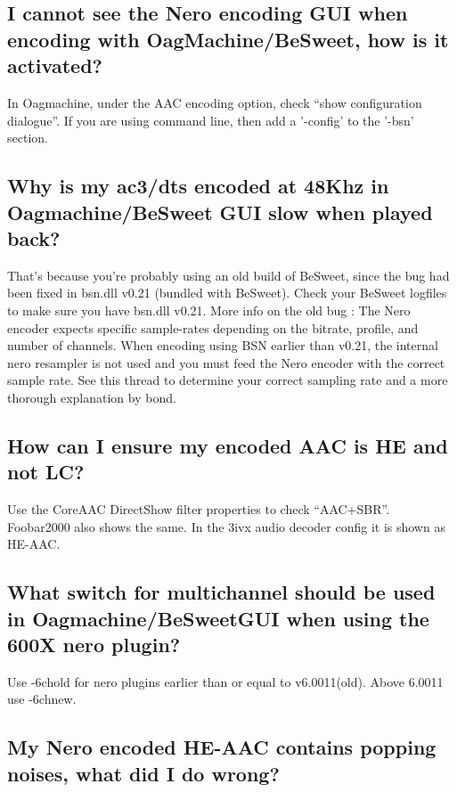 ﻿\documentclass[12pt]{article}
\begin{document}
\subsection{I cannot see the Nero encoding GUI when encoding with OagMachine/BeSweet, how is it activated?}

In Oagmachine, under the AAC encoding option, check ``show configuration dialogue''. If you are using
command line, then add a '-config' to the '-bsn' section.

\subsection{Why is my ac3/dts encoded at 48Khz in Oagmachine/BeSweet GUI slow when played back?}

That's because you're probably using an old build of BeSweet, since the bug had been fixed in
bsn.dll v0.21 (bundled with BeSweet). Check your BeSweet logfiles to make sure you have bsn.dll
v0.21. More info on the old bug : The Nero encoder expects specific sample-rates depending on the
bitrate, profile, and number of channels. When encoding using BSN earlier than v0.21, the internal
nero resampler is not used and you must feed the Nero encoder with the correct sample rate. See this
thread to determine your correct sampling rate and a more thorough explanation by bond.

\subsection{How can I ensure my encoded AAC is HE and not LC?}

Use the CoreAAC DirectShow filter properties to check ``AAC+SBR''. Foobar2000 also shows the same.
In the 3ivx audio decoder config it is shown as HE-AAC.

\subsection{What switch for multichannel should be used in Oagmachine/BeSweetGUI when using the 600X nero plugin?}

Use -6chold for nero plugins earlier than or equal to v6.0011(old). Above 6.0011 use -6chnew.

\subsection{My Nero encoded HE-AAC contains popping noises, what did I do wrong?}
\end{document}

